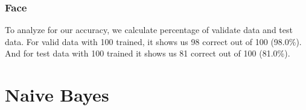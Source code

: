 \documentclass{article}
\begin{document}
        \subsubsection{Face}
            To analyze for our accuracy, we calculate percentage of validate data and test data. \newline
            For valid data with 100 trained, it shows us 98 correct out of 100 (98.0\%). And for test data with 100 trained it shows us 81 correct out of 100 (81.0\%).

\section{Naive Bayes}
\end{document}

